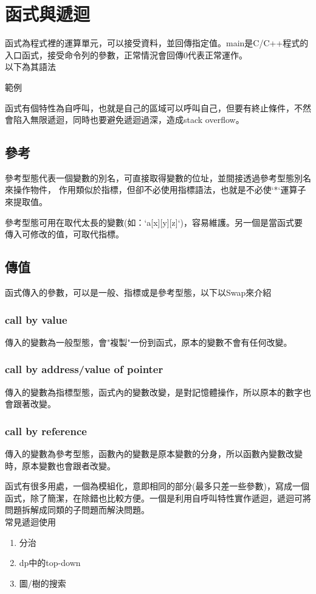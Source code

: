 \section{函式與遞迴}
函式為程式裡的運算單元，可以接受資料，並回傳指定值。main是C/C++程式的入口函式，接受命令列的參數，正常情況會回傳0代表正常運作。\\
以下為其語法

範例

函式有個特性為自呼叫，也就是自己的區域可以呼叫自己，但要有終止條件，不然會陷入無限遞迴，同時也要避免遞迴過深，造成stack overflow。


\subsection{參考}
參考型態代表一個變數的別名，可直接取得變數的位址，並間接透過參考型態別名來操作物件， 作用類似於指標，但卻不必使用指標語法，也就是不必使`*`運算子來提取值。

參考型態可用在取代太長的變數(如：`a[x][y][z]`)，容易維護。另一個是當函式要傳入可修改的值，可取代指標。
\subsection{傳值}
函式傳入的參數，可以是一般、指標或是參考型態，以下以Swap來介紹
\subsubsection{call by value}
傳入的變數為一般型態，會"複製"一份到函式，原本的變數不會有任何改變。

\subsubsection{call by address/value of pointer}
傳入的變數為指標型態，函式內的變數改變，是對記憶體操作，所以原本的數字也會跟著改變。

\subsubsection{call by reference}
傳入的變數為參考型態，函數內的變數是原本變數的分身，所以函數內變數改變時，原本變數也會跟者改變。


函式有很多用處，一個為模組化，意即相同的部分(最多只差一些參數)，寫成一個函式，除了簡潔，在除錯也比較方便。一個是利用自呼叫特性實作遞迴，遞迴可將問題拆解成同類的子問題而解決問題。\\
常見遞迴使用
\begin{enumerate}
\item 分治
\item dp中的top-down
\item 圖/樹的搜索
\end{enumerate}
